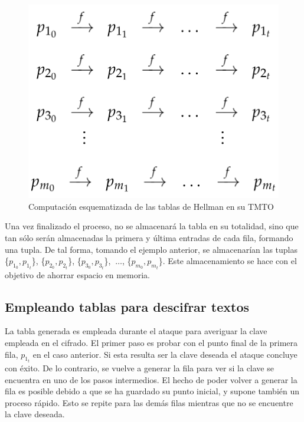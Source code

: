 \documentclass[12pt,spanish,listoffigures,listoftables,listofalgorithms]{tfgetsinf}
\begin{document}
\begin{figure}[H]
    \centering
    \includegraphics[scale = 0.25]{tabla.png}
    \caption{Computación esquematizada de las tablas de Hellman en su TMTO}
    \label{tabla}
\end{figure}

Una vez finalizado el proceso, no se almacenará la tabla en su totalidad, sino que tan sólo serán almacenadas la primera y última entradas de cada fila, formando una tupla. De tal forma, tomando el ejemplo anterior, se almacenarían las tuplas \{$p_{1_0}, p_{1_t}$\}, \{$p_{2_0}, p_{2_t}$\}, \{$p_{3_0}, p_{3_t}$\}, $~\dots$, \{$p_{m_0}, p_{m_t}$\}. Este almacenamiento se hace con el objetivo de ahorrar espacio en memoria.

\subsection{Empleando tablas para descifrar textos}

La tabla generada es empleada durante el ataque para averiguar la clave empleada en el cifrado. El primer paso es probar con el punto final de la primera fila, $p_{1_t}$ en el caso anterior. Si esta resulta ser la clave deseada el ataque concluye con éxito. De lo contrario, se vuelve a generar la fila para ver si la clave se encuentra en uno de los pasos intermedios. El hecho de poder volver a generar la fila es posible debido a que se ha guardado su punto inicial, y supone también un proceso rápido. Esto se repite para las demás filas mientras que no se encuentre la clave deseada.
\end{document}
